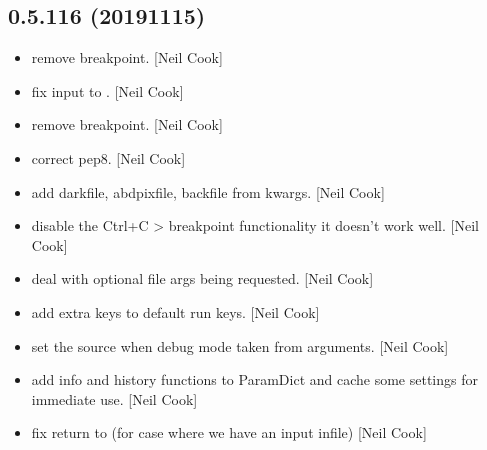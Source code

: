 \documentclass[a4paper,10pt,english]{report}
\begin{document}
\subsection{0.5.116 (2019\sphinxhyphen{}11\sphinxhyphen{}15)}
\label{\detokenize{misc/changelog:id45}}\begin{itemize}
\item {} 
 \sphinxhyphen{} remove breakpoint. {[}Neil Cook{]}

\item {} 
 \sphinxhyphen{} fix input to . {[}Neil Cook{]}

\item {} 
 \sphinxhyphen{} remove breakpoint. {[}Neil Cook{]}

\item {} 
 \sphinxhyphen{} correct pep8. {[}Neil Cook{]}

\item {} 
 \sphinxhyphen{} add darkfile, abdpixfile, backfile from
kwargs. {[}Neil Cook{]}

\item {} 
 \sphinxhyphen{} disable the Ctrl+C \textendash{}\textgreater{} breakpoint
functionality it doesn’t work well. {[}Neil Cook{]}

\item {} 
 \sphinxhyphen{} deal with optional file args
being requested. {[}Neil Cook{]}

\item {} 
 \sphinxhyphen{} add extra keys to default run
keys. {[}Neil Cook{]}

\item {} 
 \sphinxhyphen{} set the source when debug mode taken from
arguments. {[}Neil Cook{]}

\item {} 
 \sphinxhyphen{} add info and history functions to
ParamDict and cache some settings for immediate use. {[}Neil Cook{]}

\item {} 
 \sphinxhyphen{} fix return to 
(for case where we have an input infile) {[}Neil Cook{]}


\end{itemize}
\end{document}
